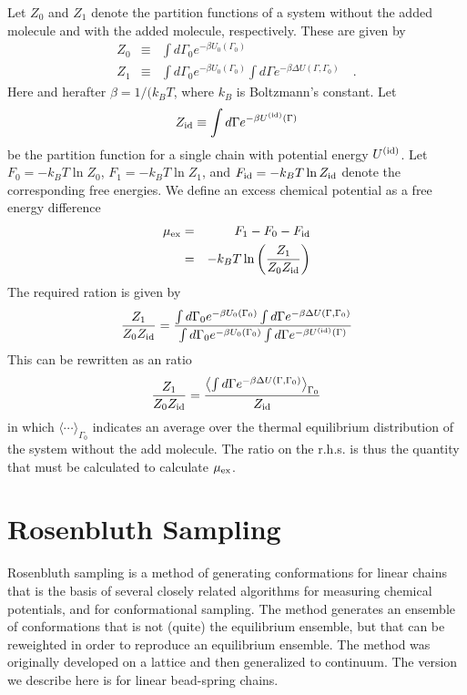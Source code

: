 \documentclass[12pt]{article} %
\newcommand\system{\Gamma_{0}}
\newcommand\chain{\Gamma}
\newcommand\Usys{U_{0}}
\newcommand\delU{\Delta U}
\newcommand\Uid{U^{({\rm id})}}
\newcommand\Ztot{Z_{1}}
\newcommand\Zsystem{Z_{0}}
\newcommand\Zid{Z_{\rm id}}
\newcommand\Ftot{F_{1}}
\newcommand\Fsystem{F_{0}}
\newcommand\Fid{F_{\rm id}}
\newcommand\muex{\mu_{\rm ex}}
\begin{document}
Let $\Zsystem$ and $\Ztot$ denote the partition functions of a system without the added 
molecule and with the added molecule, respectively. These are given by
\begin{eqnarray}
    \Zsystem & \equiv & \int d\system e^{-\beta \Usys(\system)} \\
    \Ztot  & \equiv & \int d\system e^{-\beta \Usys(\system)} 
                       \int d\chain e^{-\beta \delU(\chain, \system)}
    \quad.
\end{eqnarray}
Here and herafter $\beta = 1/(k_{B}T$, where $k_{B}$ is Boltzmann's constant.  Let 
\begin{equation}
    \Zid \equiv \int d\chain e^{-\beta \Uid(\chain) }
\end{equation}
be the partition function for a single chain with potential energy $\Uid$. Let 
$\Fsystem = -k_{B}T\ln \Zsystem$,
$\Ftot = -k_{B}T\ln \Ztot$, and
$\Fid = -k_{B}T\ln \Zid$ denote the corresponding free energies.  We define an 
excess chemical potential as a free energy difference
\begin{eqnarray}
   \muex & = & \Ftot - \Fsystem - \Fid  \nonumber \\
         & = & -k_{B}T \ln \left ( \frac{\Ztot}{\Zsystem \Zid} \right )
\end{eqnarray}
The required ration is given by
\begin{equation}
  \frac{\Ztot}{\Zsystem \Zid} =  
  \frac{ \int d\system e^{-\beta \Usys(\system)} \int d\chain e^{-\beta \delU(\chain, \system)} }
       { \int d\system e^{-\beta \Usys(\system)} \int d\chain e^{-\beta \Uid(\chain)} }
\end{equation}
This can be rewritten as an ratio
\begin{equation}
  \frac{\Ztot}{\Zsystem \Zid} = 
  \frac{\left \langle \int d\chain e^{-\beta \delU(\chain, \system)} \right \rangle_{\system}}
       {\Zid}
\end{equation}
in which $\langle \cdots \rangle_{\system}$ indicates an average over the thermal equilibrium
distribution of the system without the add molecule. The ratio on the r.h.s. is thus the
quantity that must be calculated to calculate $\muex$.

\section{Rosenbluth Sampling} %
Rosenbluth sampling is a method of generating conformations for linear chains that is the basis of several closely related algorithms for measuring chemical potentials, and for conformational sampling. The method generates an ensemble of conformations that is not (quite) the equilibrium ensemble, but that can be reweighted in order to reproduce an equilibrium ensemble. The method was originally developed on a lattice and then generalized to continuum. The version we describe here is for linear bead-spring chains.
\end{document}
